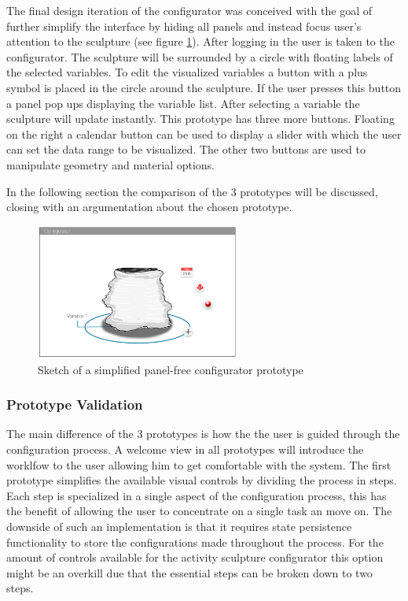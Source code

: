 \documentclass[../medieninformatik-arbeit.tex]{subfiles}
\begin{document}
The final design iteration of the configurator was conceived with the goal of further simplify the interface by hiding all panels and instead focus user's attention to the sculpture (see figure \ref{fig:uiproto3}). After logging in the user is taken to the configurator. The sculpture will be surrounded by a circle with floating labels of the selected variables. To edit the visualized variables a button with a plus symbol is placed in the circle around the sculpture. If the user presses this button a panel pop ups displaying the variable list. After selecting a variable the sculpture will update instantly. This prototype has three more buttons. Floating on the right a calendar button can be used to display a slider with which the user can set the data range to be visualized. The other two buttons are used to manipulate geometry and material options. 

In the following section the comparison of the 3 prototypes will be discussed, closing with an argumentation about the chosen prototype. 

\begin{figure}[h]
\captionsetup{width=0.9\textwidth}
\begin{center}
  \includegraphics[width=0.6\textwidth]{Prototype/img/ui_proto3}
  \caption{Sketch of a simplified panel-free configurator prototype}
\label{fig:uiproto3}
\end{center}
\end{figure}

\subsubsection{Prototype Validation}
The main difference of the 3 prototypes is how the the user is guided through the configuration process. A welcome view in all prototypes will introduce the worklfow to the user allowing him to get comfortable with the system. The first prototype simplifies the available visual controls by dividing the process in steps. Each step is specialized in a single aspect of the configuration process, this has the benefit of allowing the user to concentrate on a single task an move on. The downside of such an implementation is that it requires state persistence functionality to store the configurations made throughout the process. For the amount of controls available for the activity sculpture configurator this option might be an overkill due that the essential steps can be broken down to two steps. 
\end{document}
